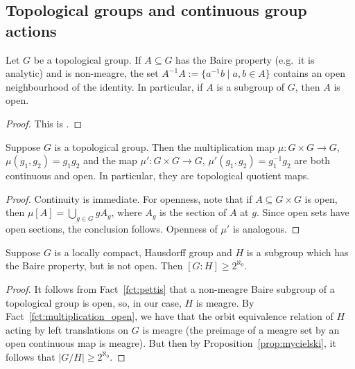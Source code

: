 	
	
	\subsection*{Topological groups and continuous group actions}
	
	
	
	\begin{fct}\label{fct:pettis}
		Let $G$ be a topological group. If $A\subseteq G$ has the Baire property (e.g.\ it is analytic) and is non-meagre, the set $A^{-1}A:=\{a^{-1}b\mid a,b \in A\}$ contains an open neighbourhood of the identity. In particular, if $A$ is a subgroup of $G$, then $A$ is open.
	\end{fct}
	\begin{proof}
		This is \cite[Theorem 9.9]{Kec95}.
	\end{proof}
	
	
	\begin{fct}
		\label{fct:multiplication_open}
		Suppose $G$ is a topological group. Then the multiplication map $\mu\colon G\times G\to G$, $\mu(g_1,g_2)=g_1g_2$ and the map $\mu'\colon G\times G\to G$, $\mu'(g_1,g_2)=g_1^{-1}g_2$ are both continuous and open. In particular, they are topological quotient maps.
	\end{fct}
	\begin{proof}
		Continuity is immediate. For openness, note that if $A\subseteq G\times G$ is open, then $\mu[A]=\bigcup_{g\in G} gA_g$, where $A_g$ is the section of $A$ at $g$. Since open sets have open sections, the conclusion follows. Openness of $\mu'$ is analogous.
	\end{proof}
	
	\begin{fct}\label{fct:from_mycielski}
		Suppose $G$ is a locally compact, Hausdorff group and $H$ is a subgroup which has the Baire property, but is not open. Then $[G:H]\geq 2^{\aleph_0}$.
	\end{fct}
	\begin{proof}
		It follows from Fact~\ref{fct:pettis} that a non-meagre Baire subgroup of a topological group is open, so, in our case, $H$ is meagre. By Fact~\ref{fct:multiplication_open}, we have that the orbit equivalence relation of $H$ acting by left translations on $G$ is meagre (the preimage of a meagre set by an open continuous map is meagre). But then by Proposition~\ref{prop:mycielski}, it follows that $\lvert G/H\rvert\geq 2^{\aleph_0}$.
	\end{proof}
	
